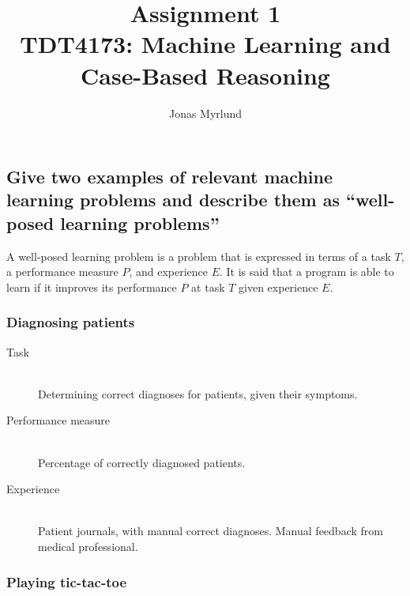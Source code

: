 \documentclass[11pt,a4paper]{article}
\begin{document}
  \title{Assignment 1 \\ \large{TDT4173: Machine Learning and Case-Based Reasoning}}
  \author{Jonas Myrlund}

  \maketitle

  \section{} %
  \label{sec1}

    \subsection{Give two examples of relevant machine learning problems and describe them as ``well-posed learning problems''} %
    \label{sub11}
    
      A well-posed learning problem is a problem that is expressed in terms of a task $T$, a performance measure $P$, and experience $E$.
      It is said that a program is able to learn if it improves its performance $P$ at task $T$ given experience $E$.
      
      \subsubsection{Diagnosing patients} %
      \label{ssub:diagnosing_patients}
        
        \begin{description}
          \item[Task] \hfill \\
            Determining correct diagnoses for patients, given their symptoms.
          \item[Performance measure] \hfill \\
            Percentage of correctly diagnosed patients.
          \item[Experience] \hfill \\
            Patient journals, with manual correct diagnoses. Manual feedback from medical professional.
        \end{description}
        
    
      \subsubsection{Playing tic-tac-toe} %
      \label{ssub:playing_tic_tac_toe}
      
\end{document}
